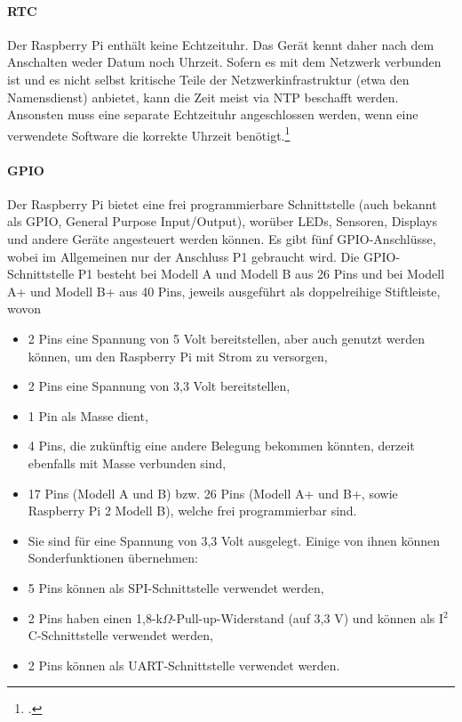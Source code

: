 \paragraph{RTC}

Der Raspberry Pi enthält keine Echtzeituhr. Das Gerät kennt daher nach dem Anschalten weder Datum noch Uhrzeit. Sofern es mit dem Netzwerk verbunden ist und es nicht selbst kritische Teile der Netzwerkinfrastruktur (etwa den Namensdienst) anbietet, kann die Zeit meist via NTP beschafft werden. Ansonsten muss eine separate Echtzeituhr angeschlossen werden, wenn eine verwendete Software die korrekte Uhrzeit benötigt.\footcite{shit_raspi}

\paragraph{GPIO}

Der Raspberry Pi bietet eine frei programmierbare Schnittstelle (auch bekannt als GPIO, General Purpose Input/Output), worüber LEDs, Sensoren, Displays und andere Geräte angesteuert werden können. Es gibt fünf GPIO-Anschlüsse, wobei im Allgemeinen nur der Anschluss P1 gebraucht wird. Die GPIO-Schnittstelle P1 besteht bei Modell A und Modell B aus 26 Pins und bei Modell A+ und Modell B+ aus 40 Pins, jeweils ausgeführt als doppelreihige Stiftleiste, wovon\\

\begin{itemize}
\item 2 Pins eine Spannung von 5 Volt bereitstellen, aber auch genutzt werden können, um den Raspberry Pi mit Strom zu versorgen,
\item 2 Pins eine Spannung von 3,3 Volt bereitstellen,
\item 1 Pin als Masse dient,
\item 4 Pins, die zukünftig eine andere Belegung bekommen könnten, derzeit ebenfalls mit Masse verbunden sind,
\item 17 Pins (Modell A und B) bzw. 26 Pins (Modell A+ und B+, sowie Raspberry Pi 2 Modell B), welche frei programmierbar sind. \item Sie sind für eine Spannung von 3,3 Volt ausgelegt. Einige von ihnen können Sonderfunktionen übernehmen:
\item 5 Pins können als SPI-Schnittstelle verwendet werden,
\item 2 Pins haben einen 1,8-k$\Omega$-Pull-up-Widerstand (auf 3,3 V) und können als I$^2$C-Schnittstelle verwendet werden,
\item 2 Pins können als UART-Schnittstelle verwendet werden.
\end{itemize}
\noindent

